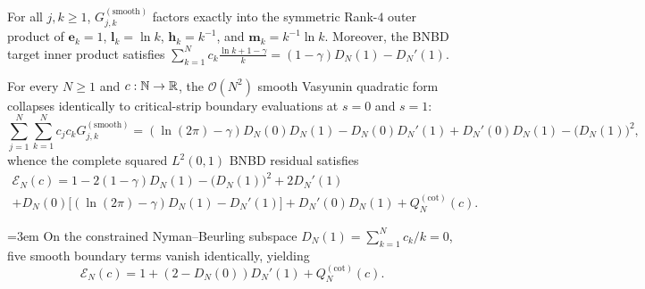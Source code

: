 \begin{lemma}
\label{lem:gsmooth_rank4}
\leanok
For all $j, k \ge 1$, $G_{j,k}^{(\mathrm{smooth})}$ factors exactly into the symmetric Rank-$4$ outer product of $\mathbf{e}_k = 1$, $\mathbf{l}_k = \ln k$, $\mathbf{h}_k = k^{-1}$, and $\mathbf{m}_k = k^{-1}\ln k$. Moreover, the BNBD target inner product satisfies $\sum_{k=1}^N c_k \frac{\ln k + 1 - \gamma}{k} = (1 - \gamma) D_N(1) - D_N'(1)$.
\end{lemma}

\begin{theorem}
\label{thm:rank4_boundary_reduction}
\leanok
For every $N \ge 1$ and $c : \mathbb{N} \to \mathbb{R}$, the $\mathcal{O}(N^2)$ smooth Vasyunin quadratic form collapses identically to critical-strip boundary evaluations at $s = 0$ and $s = 1$:
\begin{equation}
\sum_{j=1}^N \sum_{k=1}^N c_j c_k G_{j,k}^{(\mathrm{smooth})} = (\ln(2\pi) - \gamma) D_N(0) D_N(1) - D_N(0) D_N'(1) + D_N'(0) D_N(1) - \big(D_N(1)\big)^2,
\end{equation}
whence the complete squared $L^2(0,1)$ BNBD residual satisfies
\begin{multline}
\mathcal{E}_N(c) = 1 - 2(1 - \gamma) D_N(1) - \big(D_N(1)\big)^2 + 2 D_N'(1) \\
+ D_N(0)\Big[(\ln(2\pi) - \gamma) D_N(1) - D_N'(1)\Big] + D_N'(0) D_N(1) + Q_N^{(\mathrm{cot})}(c).
\end{multline}
\end{theorem}

\begin{corollary}
\label{cor:constrained_bdr_collapse}
\leanok
{\emergencystretch=3em
On the constrained Nyman--Beurling subspace $D_N(1) = \sum_{k=1}^N c_k/k = 0$, five smooth boundary terms vanish identically, yielding
$$\mathcal{E}_N(c) = 1 + (2 - D_N(0)) D_N'(1) + Q_N^{(\mathrm{cot})}(c).$$
}
\end{corollary}

